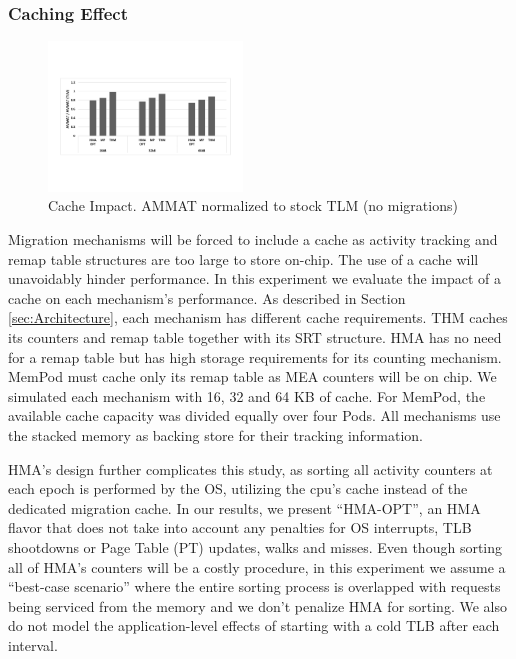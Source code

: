 \subsubsection{Caching Effect}

\begin{figure}
  \includegraphics[width=0.46\textwidth]{figures/cache_impact.pdf}
  \caption{Cache Impact. AMMAT normalized to stock TLM (no migrations)}
  \label{fig:cache}
\end{figure}

Migration mechanisms will be forced to include a cache as activity tracking and remap table structures are too large to store on-chip. The use of a cache will unavoidably hinder performance. In this experiment we evaluate the impact of a cache on each mechanism's performance. As described in Section \ref{sec:Architecture}, each mechanism has different cache requirements. THM caches its counters and remap table together with its SRT structure. HMA has no need for a remap table but has high storage requirements for its counting mechanism. MemPod must cache only its remap table as MEA counters will be on chip. We simulated each mechanism with 16, 32 and 64 KB of cache. For MemPod, the available cache capacity was divided equally over four Pods. All mechanisms use the stacked memory as backing store for their tracking information.

HMA's design further complicates this study, as sorting all activity counters at each epoch is performed by the OS, utilizing the cpu's cache instead of the dedicated migration cache. In our results, we present ``HMA-OPT'', an HMA flavor that does not take into account any penalties for OS interrupts, TLB shootdowns or Page Table (PT) updates, walks and misses. Even though sorting all of HMA's counters will be a costly procedure, in this experiment we assume a ``best-case scenario'' where the entire sorting process is overlapped with requests being serviced from the memory and we don't penalize HMA for sorting. We also do not model the application-level effects of starting with a cold TLB after each interval.

